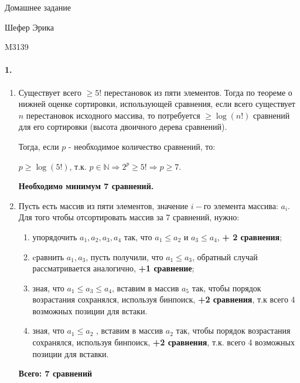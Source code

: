 \documentclass[]{article}
\begin{document}
\fontsize{12}{15pt}\selectfont
{}

\begin{center}
\fontsize{16}{16pt} \selectfont
\bf{
Домашнее задание

Шефер Эрика

M3139
}
\end{center}
\paragraph{1.} 

\begin{enumerate}

\item Существует всего $\geq 5!$ перестановок из пяти элементов. Тогда по теореме о нижней оценке сортировки, использующей сравнения, если всего существует $n$ перестановок исходного массива, то потребуется $\geq \log(n!)$ сравнений для его сортировки (высота двоичного дерева сравнений). 

Тогда, если $p$ - необходимое количество сравнений, то:

\begin{center}
$p \geq \log(5!)$, т.к. $p \in \mathbb{N} \Rightarrow 2^p \geq 5! \Rightarrow p \geq 7$.
\end{center}

{\bf Необходимо минимум 7 сравнений.}

\item Пусть есть массив из пяти элементов,  значение $i-$го элемента массива: $a_i$. Для того чтобы отсортировать  массив за 7 сравнений, нужно:
\begin{enumerate}
\item упорядочить $a_1, a_2, a_3, a_4$ так, что $a_1 \leq a_2$ и $a_3 \leq a_4$, {\bf+ 2 сравнения};
\item cравнить $a_1, a_3$, пусть получили, что $a_1 \leq a_3$, обратный случай рассматривается аналогично, {\bf+1 сравнение};
\item зная, что $a_1 \leq a_3 \leq a_4$, вставим в массив $a_5$ так, чтобы порядок возрастания сохранялся, используя бинпоиск, {\bf+2 сравнения}, т.к всего 4 возможных позиции для встаки.
\item зная, что $a_1 \leq a_2$ , вставим в массив $a_2$ так, чтобы порядок возрастания сохранялся, используя бинпоиск, {\bf+2 сравнения}, т.к. всего 4 возможных позиции для вставки.
\end{enumerate}
{\bf Всего: 7 сравнений}
\end{enumerate}
\end{document}
